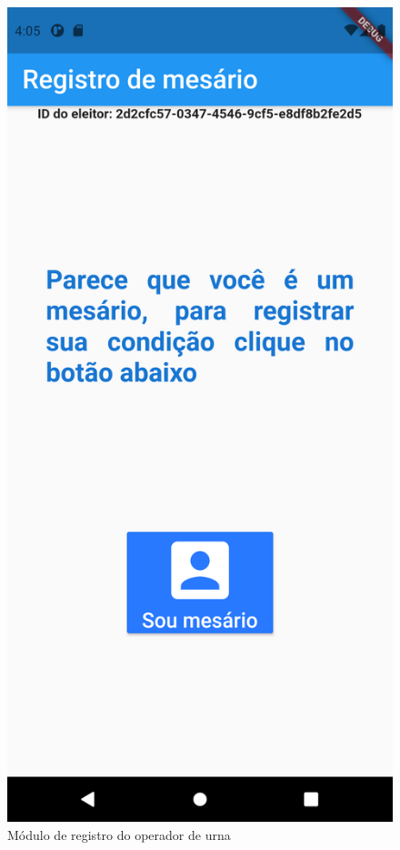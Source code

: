 \begin{figure}[!htb]
\centering
\begin{minipage}{0.45\textwidth}%
	\includegraphics[width=.9\textwidth]{imagens/wallet_mesario}
	\caption{Módulo de registro do operador de urna}
	\label{fig:wallet_mesario}
\end{minipage}
\hfill
\begin{minipage}{0.45\textwidth}%

\end{minipage}
\end{figure}
